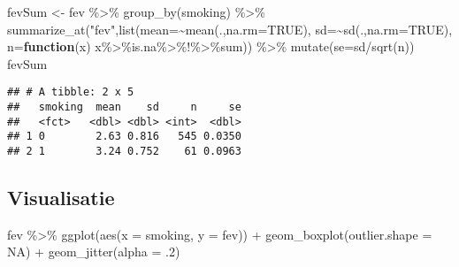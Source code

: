\documentclass[
]{article}
\newenvironment{Shaded}{\begin{snugshade}}{\end{snugshade}}
\newcommand{\AttributeTok}[1]{\textcolor[rgb]{0.77,0.63,0.00}{#1}}
\newcommand{\ConstantTok}[1]{\textcolor[rgb]{0.00,0.00,0.00}{#1}}
\newcommand{\ControlFlowTok}[1]{\textcolor[rgb]{0.13,0.29,0.53}{\textbf{#1}}}
\newcommand{\DecValTok}[1]{\textcolor[rgb]{0.00,0.00,0.81}{#1}}
\newcommand{\FunctionTok}[1]{\textcolor[rgb]{0.00,0.00,0.00}{#1}}
\newcommand{\NormalTok}[1]{#1}
\newcommand{\OtherTok}[1]{\textcolor[rgb]{0.56,0.35,0.01}{#1}}
\newcommand{\SpecialCharTok}[1]{\textcolor[rgb]{0.00,0.00,0.00}{#1}}
\newcommand{\StringTok}[1]{\textcolor[rgb]{0.31,0.60,0.02}{#1}}
\begin{document}
\begin{Shaded}
\begin{Highlighting}[]
\NormalTok{fevSum }\OtherTok{\textless{}{-}}\NormalTok{ fev }\SpecialCharTok{\%\textgreater{}\%}
  \FunctionTok{group\_by}\NormalTok{(smoking) }\SpecialCharTok{\%\textgreater{}\%}
    \FunctionTok{summarize\_at}\NormalTok{(}\StringTok{"fev"}\NormalTok{,}\FunctionTok{list}\NormalTok{(}\AttributeTok{mean=}\SpecialCharTok{\textasciitilde{}}\FunctionTok{mean}\NormalTok{(.,}\AttributeTok{na.rm=}\ConstantTok{TRUE}\NormalTok{),}
                    \AttributeTok{sd=}\SpecialCharTok{\textasciitilde{}}\FunctionTok{sd}\NormalTok{(.,}\AttributeTok{na.rm=}\ConstantTok{TRUE}\NormalTok{),}
                    \AttributeTok{n=}\ControlFlowTok{function}\NormalTok{(x) x}\SpecialCharTok{\%\textgreater{}\%}\NormalTok{is.na}\SpecialCharTok{\%\textgreater{}\%}\StringTok{\textasciigrave{}}\AttributeTok{!}\StringTok{\textasciigrave{}}\SpecialCharTok{\%\textgreater{}\%}\NormalTok{sum)) }\SpecialCharTok{\%\textgreater{}\%}
  \FunctionTok{mutate}\NormalTok{(}\AttributeTok{se=}\NormalTok{sd}\SpecialCharTok{/}\FunctionTok{sqrt}\NormalTok{(n))}
\NormalTok{fevSum}
\end{Highlighting}
\end{Shaded}

\begin{verbatim}
## # A tibble: 2 x 5
##   smoking  mean    sd     n     se
##   <fct>   <dbl> <dbl> <int>  <dbl>
## 1 0        2.63 0.816   545 0.0350
## 2 1        3.24 0.752    61 0.0963
\end{verbatim}

\hypertarget{visualisatie}{%
\subsection{Visualisatie}\label{visualisatie}}

\begin{Shaded}
\begin{Highlighting}[]
\NormalTok{fev }\SpecialCharTok{\%\textgreater{}\%}
  \FunctionTok{ggplot}\NormalTok{(}\FunctionTok{aes}\NormalTok{(}\AttributeTok{x =}\NormalTok{ smoking, }\AttributeTok{y =}\NormalTok{ fev)) }\SpecialCharTok{+}
  \FunctionTok{geom\_boxplot}\NormalTok{(}\AttributeTok{outlier.shape =} \ConstantTok{NA}\NormalTok{) }\SpecialCharTok{+}
  \FunctionTok{geom\_jitter}\NormalTok{(}\AttributeTok{alpha =}\NormalTok{ .}\DecValTok{2}\NormalTok{)}
\end{Highlighting}
\end{Shaded}
\end{document}
